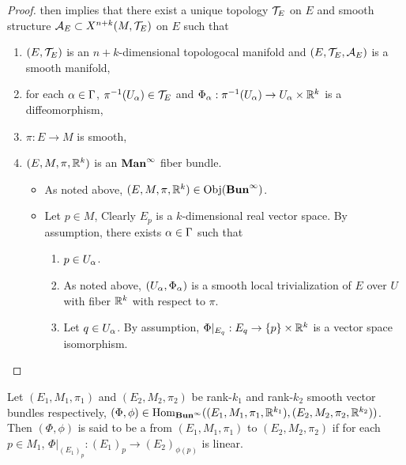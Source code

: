 \documentclass{book}
\begin{document}
\begin{proof}
	then  implies that there exist a unique topology $\mathcal{T}_E$ on $E$ and smooth structure $\mathcal{A}_E \subset X^{n+k}(M, \mathcal{T}_E)$ on $E$ such that
	\begin{enumerate}
		\item $(E, \mathcal{T}_E)$ is an $n+k$-dimensional topologocal manifold and $(E, \mathcal{T}_E, \mathcal{A}_E)$ is a smooth manifold,
		\item for each $\alpha \in \Gamma$, $ \pi^{-1}(U_{\alpha}) \in \mathcal{T}_E$ and $\Phi_{\alpha}: \pi^{-1}(U_{\alpha}) \rightarrow U_{\alpha} \times \mathbb{R}^k$ is a diffeomorphism,
		\item $\pi: E \rightarrow M$ is smooth,
		\item $(E, M, \pi, \mathbb{R}^k)$ is an $\operatorname*{\text{\textbf{Man}}^{\infty}}$ fiber bundle. 
		\begin{itemize}
			\item As noted above, $(E, M, \pi, \mathbb{R}^k) \in \operatorname{Obj}(\operatorname*{\text{\textbf{Bun}}^{\infty}})$.
			\item Let $p \in M$, Clearly $E_p$ is a $k$-dimensional real vector space. By assumption, there exists $\alpha \in \Gamma$ such that
			\begin{enumerate}
				\item $p \in U_{\alpha}$. 
				\item As noted above, $(U_{\alpha}, \Phi_{\alpha})$ is a smooth local trivialization of $E$ over $U$ with fiber $\mathbb{R}^k$ with respect to $\pi$. 
				\item Let $q \in U_{\alpha}$. By assumption, $\Phi|_{E_q}: E_q \rightarrow \{p\} \times \mathbb{R}^k$ is a vector space isomorphism.
			\end{enumerate}
		\end{itemize}
	\end{enumerate}
	

\end{proof}

\begin{defn} 
	Let $(E_1, M_1, \pi_1)$ and $(E_2, M_2, \pi_2)$ be rank-$k_1$ and rank-$k_2$ smooth vector bundles respectively, $(\Phi, \phi) \in \operatorname{Hom}_{\operatorname*{\text{\textbf{Bun}}^{\infty}}}((E_1, M_1, \pi_1, \mathbb{R}^{k_1}), (E_2, M_2, \pi_2, \mathbb{R}^{k_2}))$. Then $(\Phi, \phi)$ is said to be a  from $(E_1, M_1, \pi_1)$ to $(E_2, M_2, \pi_2)$ if for each $p \in M_1$, $\Phi|_{(E_1)_p}: (E_1)_p \rightarrow (E_2)_{\phi(p)}$ is linear.
\end{defn}
\end{document}
